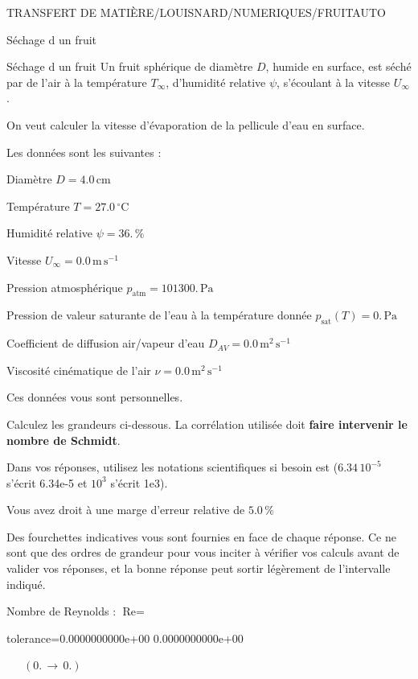 \documentclass[12pt]{article}
\begin{document}
\begin{quiz}{TRANSFERT DE MATIÈRE/LOUISNARD/NUMERIQUES/FRUITAUTO}
\begin{cloze}{Séchage d un fruit}
\end{cloze} 


 \begin{cloze}{Séchage d un fruit} 
Un fruit sphérique de diamètre $D$, humide en surface, est séché par de l'air à la température $T_\infty$, d'humidité relative $\psi$, s'écoulant à la vitesse $U_\infty$.

On veut calculer la vitesse d'évaporation de la pellicule d'eau en surface.

 

Les données sont les suivantes :

 

Diamètre $D = 4.0\,  \mathrm{cm} $

Température $T = 27.0\,  \mathrm{^\circ\mathrm{C}} $

Humidité relative $\psi = 36.\, \% $

Vitesse $U_\infty = 0.0\,  \mathrm{m}\,  \mathrm{s}^{-1} $

Pression atmosphérique $p_{\text{atm}} = 101300.\,  \mathrm{Pa} $

Pression de valeur saturante de l’eau à la température donnée $p_{\text{sat}}(T) = 0.\,  \mathrm{Pa} $

Coefficient de diffusion air/vapeur d’eau $D_{AV} = 0.0\,  \mathrm{m}^{2}\,  \mathrm{s}^{-1} $

Viscosité cinématique de l’air $\nu = 0.0\,  \mathrm{m}^{2}\,  \mathrm{s}^{-1} $

Ces données vous sont personnelles.

 

Calculez les grandeurs ci-dessous. La corrélation utilisée doit \textbf{faire intervenir le nombre de Schmidt}.

Dans vos réponses, utilisez les notations scientifiques si besoin est ($6.34\, 10^{-5}$ s'écrit 6.34e-5 et $10^{3}$ s'écrit 1e3).

Vous avez droit à une marge d'erreur relative de $5.0\, \% $

Des fourchettes indicatives vous sont fournies en face de chaque réponse. Ce ne sont que des ordres de grandeur pour vous inciter à vérifier vos calculs avant de valider vos réponses, et la bonne réponse peut sortir légèrement de l'intervalle indiqué.

 

Nombre de Reynolds : $\text{Re} =  $
\begin{numerical}[points=1] 
\item[tolerance={0.0000000000e+00}] 0.0000000000e+00 
\end{numerical} 
 $\,$ 
 $ \quad (0. \, \rightarrow \, 0.) $ 


\end{cloze}
\end{quiz}
\end{document}
